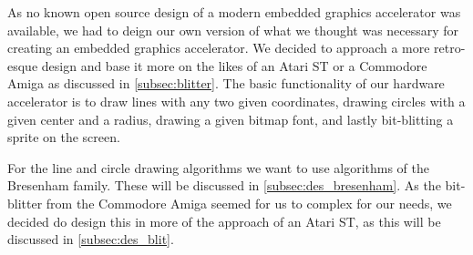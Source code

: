 As no known open source design of a modern embedded graphics accelerator was available, we had to deign our own version of what we thought was necessary for creating an embedded graphics accelerator. We decided to approach a more retro-esque design and base it more on the likes of an Atari ST or a Commodore Amiga as discussed in \cref{subsec:blitter}. The basic functionality of our hardware accelerator is to draw lines with any two given coordinates, drawing circles with a given center and a radius, drawing a given bitmap font, and lastly bit-blitting a sprite on the screen.

For the line and circle drawing algorithms we want to use algorithms of the Bresenham family. These will be discussed in \cref{subsec:des_bresenham}. As the bit-blitter from the Commodore Amiga seemed for us to complex for our needs, we decided do design this in more of the approach of an Atari ST, as this will be discussed in \cref{subsec:des_blit}.
